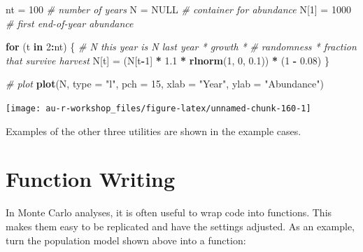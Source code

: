 \documentclass[]{book}
\newenvironment{Shaded}{\begin{snugshade}}{\end{snugshade}}
\newcommand{\KeywordTok}[1]{\textcolor[rgb]{0.13,0.29,0.53}{\textbf{#1}}}
\newcommand{\DataTypeTok}[1]{\textcolor[rgb]{0.13,0.29,0.53}{#1}}
\newcommand{\DecValTok}[1]{\textcolor[rgb]{0.00,0.00,0.81}{#1}}
\newcommand{\FloatTok}[1]{\textcolor[rgb]{0.00,0.00,0.81}{#1}}
\newcommand{\StringTok}[1]{\textcolor[rgb]{0.31,0.60,0.02}{#1}}
\newcommand{\CommentTok}[1]{\textcolor[rgb]{0.56,0.35,0.01}{\textit{#1}}}
\newcommand{\OtherTok}[1]{\textcolor[rgb]{0.56,0.35,0.01}{#1}}
\newcommand{\ControlFlowTok}[1]{\textcolor[rgb]{0.13,0.29,0.53}{\textbf{#1}}}
\newcommand{\OperatorTok}[1]{\textcolor[rgb]{0.81,0.36,0.00}{\textbf{#1}}}
\newcommand{\NormalTok}[1]{#1}
\theoremstyle{definition}
\theoremstyle{definition}
\theoremstyle{definition}
\theoremstyle{remark}
\begin{document}
\begin{Shaded}
\begin{Highlighting}[]
\NormalTok{nt =}\StringTok{ }\DecValTok{100}       \CommentTok{# number of years}
\NormalTok{N =}\StringTok{ }\OtherTok{NULL}       \CommentTok{# container for abundance}
\NormalTok{N[}\DecValTok{1}\NormalTok{] =}\StringTok{ }\DecValTok{1000}    \CommentTok{# first end-of-year abundance}

\ControlFlowTok{for}\NormalTok{ (t }\ControlFlowTok{in} \DecValTok{2}\OperatorTok{:}\NormalTok{nt) \{}
  \CommentTok{# N this year is N last year * growth *}
    \CommentTok{# randomness * fraction that survive harvest}
\NormalTok{  N[t] =}\StringTok{ }\NormalTok{(N[t}\OperatorTok{-}\DecValTok{1}\NormalTok{] }\OperatorTok{*}\StringTok{ }\FloatTok{1.1} \OperatorTok{*}\StringTok{ }\KeywordTok{rlnorm}\NormalTok{(}\DecValTok{1}\NormalTok{, }\DecValTok{0}\NormalTok{, }\FloatTok{0.1}\NormalTok{)) }\OperatorTok{*}\StringTok{ }\NormalTok{(}\DecValTok{1} \OperatorTok{-}\StringTok{ }\FloatTok{0.08}\NormalTok{)}
\NormalTok{\}}

\CommentTok{# plot}
\KeywordTok{plot}\NormalTok{(N, }\DataTypeTok{type =} \StringTok{"l"}\NormalTok{, }\DataTypeTok{pch =} \DecValTok{15}\NormalTok{, }\DataTypeTok{xlab =} \StringTok{"Year"}\NormalTok{, }\DataTypeTok{ylab =} \StringTok{"Abundance"}\NormalTok{)}
\end{Highlighting}
\end{Shaded}

\begin{center}\texttt{[image: au-r-workshop\_files/figure-latex/unnamed-chunk-160-1]} \end{center}

Examples of the other three utilities are shown in the example cases.

\section{Function Writing}\label{adv-funcs}

In Monte Carlo analyses, it is often useful to wrap code into functions.
This makes them easy to be replicated and have the settings adjusted. As
an example, turn the population model shown above into a function:
\end{document}
